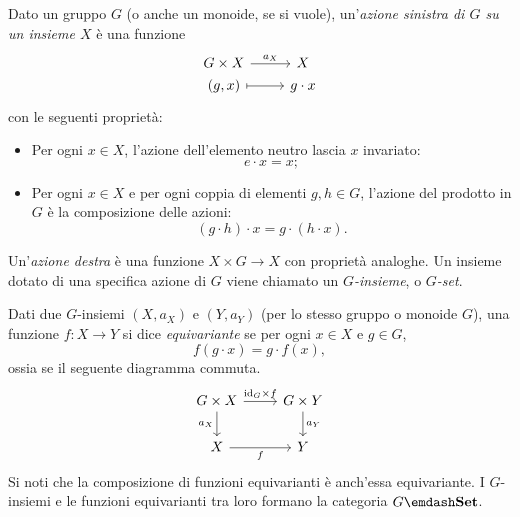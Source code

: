 \begin{example}\label{ex_cat_g_insiemi}
	Dato un gruppo \(G\) (o anche un monoide, se si vuole), un'\emph{azione sinistra di \(G\) su un insieme \(X\)} è una funzione
	\[
		\begin{tikzcd}[row sep=0]
			G\times X \ar{r}{a_X} & X \\
			(g,x) \ar[mapsto]{r} & g\cdot x
		\end{tikzcd}
	\]
	con le seguenti proprietà:
	\begin{itemize}
		\item Per ogni \(x\in X\), l'azione dell'elemento neutro lascia \(x\) invariato:
		      \[
			      e\cdot x = x ;
		      \]
		\item Per ogni \(x\in X\) e per ogni coppia di elementi \(g,h\in G\), l'azione del prodotto in \(G\) è la composizione delle azioni:
		      \[
			      (g\cdot h)\cdot x = g\cdot(h\cdot x) .
		      \]
	\end{itemize}
	Un'\emph{azione destra} è una funzione \(X\times G\to X\) con proprietà analoghe.
	Un insieme dotato di una specifica azione di \(G\) viene chiamato un \emph{\(G\)-insieme}, o \emph{\(G\)-set}.

	Dati due \(G\)-insiemi \((X,a_X)\) e \((Y,a_Y)\) (per lo stesso gruppo o monoide \(G\)), una funzione \(f:X\to Y\) si dice \emph{equivariante} se per ogni \(x\in X\) e \(g\in G\),
	\[
		f(g\cdot x) = g\cdot f(x) ,
	\]
	ossia se il seguente diagramma commuta.
	\[
		\begin{tikzcd}
			G\times X \ar{r}{\id_G\times f} \ar[d, "a_X"'] & G\times Y \ar{d}{a_Y} \\
			X \ar[r, "f"'] & Y
		\end{tikzcd}
	\]
	Si noti che la composizione di funzioni equivarianti è anch'essa equivariante. I \(G\)-insiemi e le funzioni equivarianti tra loro formano la categoria \(G\emdash\ctSet\).
\end{example}
\begin{example}
\end{example}
\begin{example}
\end{example}
